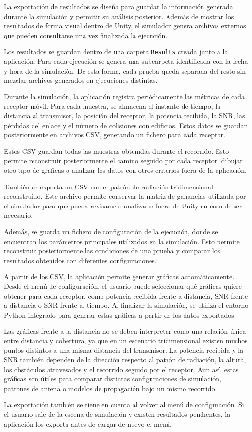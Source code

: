 La exportación de resultados se diseña para guardar la información generada durante la simulación y permitir su análisis posterior. Además de mostrar los resultados de forma visual dentro de Unity, el simulador genera archivos externos que pueden consultarse una vez finalizada la ejecución.

Los resultados se guardan dentro de una carpeta \texttt{Results} creada junto a la aplicación. Para cada ejecución se genera una subcarpeta identificada con la fecha y hora de la simulación. De esta forma, cada prueba queda separada del resto sin mezclar archivos generados en ejecuciones distintas.

Durante la simulación, la aplicación registra periódicamente las métricas de cada receptor móvil. Para cada muestra, se almacena el instante de tiempo, la distancia al transmisor, la posición del receptor, la potencia recibida, la SNR, las pérdidas del enlace y el número de colisiones con edificios. Estos datos se guardan posteriormente en archivos CSV, generando un fichero para cada receptor.

Estos CSV guardan todas las muestras obtenidas durante el recorrido. Esto permite reconstruir posteriormente el camino seguido por cada receptor, dibujar otro tipo de gráficas o analizar los datos con otros criterios fuera de la aplicación.

También se exporta un CSV con el patrón de radiación tridimensional reconstruido. Este archivo permite conservar la matriz de ganancias utilizada por el simulador para que pueda revisarse o analizarse fuera de Unity en caso de ser necesario.

Además, se guarda un fichero de configuración de la ejecución, donde se encuentran los parámetros principales utilizados en la simulación. Esto permite reconstruir posteriormente las condiciones de una prueba y comparar los resultados obtenidos con diferentes configuraciones.

A partir de los CSV, la aplicación permite generar gráficas automáticamente. Desde el menú de configuración, el usuario puede seleccionar qué gráficas quiere obtener para cada receptor, como potencia recibida frente a distancia, SNR frente a distancia o SNR frente al tiempo. Al finalizar la simulación, se utiliza el entorno Python integrado para generar estas gráficas a partir de los datos exportados.

Las gráficas frente a la distancia no se deben interpretar como una relación única entre distancia y cobertura, ya que en un escenario tridimensional existen muchos puntos distintos a una misma distancia del transmisor. La potencia recibida y la SNR también dependen de la dirección respecto al patrón de radiación, la altura, los obstáculos atravesados y el recorrido seguido por el receptor. Aun así, estas gráficas son útiles para comparar distintas configuraciones de simulación, patrones de antena o modelos de propagación bajo un mismo recorrido.

La exportación también se tiene en cuenta al volver al menú de configuración. Si el usuario sale de la escena de simulación y existen resultados pendientes, la aplicación los exporta antes de cargar de nuevo el menú.